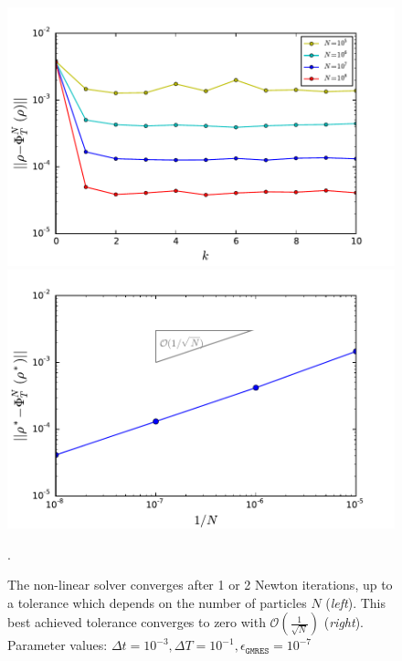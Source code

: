 \begin{figure}[h]
\centering
\includegraphics[width=0.5\linewidth]{../Problems/WeightedParticles/checkSystem/Newton/plots/Newton_sde_res(k)_Dt_e-2_tol1e-7.pdf}
\includegraphics[width=0.49\linewidth]{../Problems/WeightedParticles/checkSystem/Newton/plots/Tolerance_on_NK-solution_converges_N-1_tol_1e-7.pdf}

\caption{ The non-linear solver converges after 1 or 2 Newton iterations, up to a tolerance which depends on the number of particles $N$ (\textit{left}). This best achieved tolerance converges to zero with  $\mathcal{O}(\frac{1}{\sqrt{N}})$ (\textit{right}). Parameter values:  $\Delta t = 10^{-3}, \Delta T = 10^{-1} , \epsilon_{\texttt{GMRES}}=10^{-7}$
}.
\label{fig:Newton_sde_res(k)}
\end{figure}




